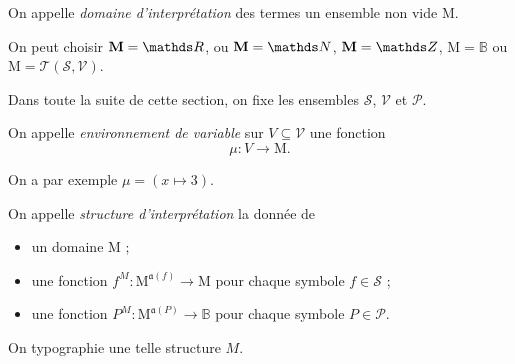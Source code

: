 \begin{defn}[Domaine]
	On appelle \textit{domaine d'interprétation} des termes un ensemble non vide $\mathbf{\mathrm{M}}$.
\end{defn}

\begin{exm}
	On peut choisir $\mathbf{\mathrm{M}} = \R$, ou $\mathbf{\mathrm{M}} = \N$, $\mathbf{\mathrm{M}} = \Z$, $\mathbf{\mathrm{M}} = \mathds{B}$\/ ou $\mathbf{\mathrm{M}} = \mathcal{T}(\mathcal{S}, \mathcal{V})$.
\end{exm}

Dans toute la suite de cette section, on fixe les ensembles $\mathcal{S}$, $\mathcal{V}$\/ et $\mathcal{P}$.

\begin{defn}
	On appelle \textit{environnement de variable} sur $V \subseteq \mathcal{V}$\/ une fonction \[
		\mu : V \longrightarrow \mathbf{\mathrm{M}}
	.\]
\end{defn}

\begin{exm}
	On a par exemple $\mu= (x \mapsto 3)$.
\end{exm}

\begin{defn}
	On appelle \textit{structure d'interprétation} la donnée de
	\begin{itemize}
		\item un domaine $\mathbf{\mathrm{M}}$\/ ;
		\item une fonction $f^M : \mathbf{\mathrm{M}}^{\mathfrak{a}(f)} \longrightarrow \mathbf{\mathrm{M}}$\/ pour chaque symbole $f \in \mathcal{S}$\/ ;
		\item une fonction $P^M : \mathbf{\mathrm{M}}^{\mathfrak{a}(P)} \longrightarrow \mathds{B}$\/ pour chaque symbole $P \in \mathcal{P}$.
	\end{itemize}
	On typographie une telle structure $M$.
\end{defn}

